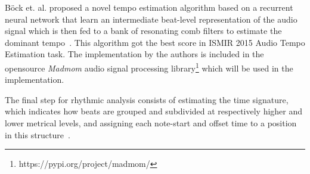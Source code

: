 B\"{o}ck et. al. proposed a novel tempo estimation algorithm based on a recurrent neural network that learn an intermediate
beat-level representation of the audio signal which is then fed to a bank of resonating comb filters to estimate
the dominant tempo~\cite{madmom}. This algorithm got the best score in ISMIR 2015 Audio Tempo Estimation task.
The implementation by the authors is included in the opensource \textit{Madmom} audio signal processing
library\footnote{https://pypi.org/project/madmom/} which will be used in the implementation.

The final step for rhythmic analysis consists of estimating the time signature, which indicates how beats are grouped
and subdivided at respectively higher and lower metrical levels, and assigning each note-start and offset time to
a position in this structure~\cite{cemgil2011monte}.

